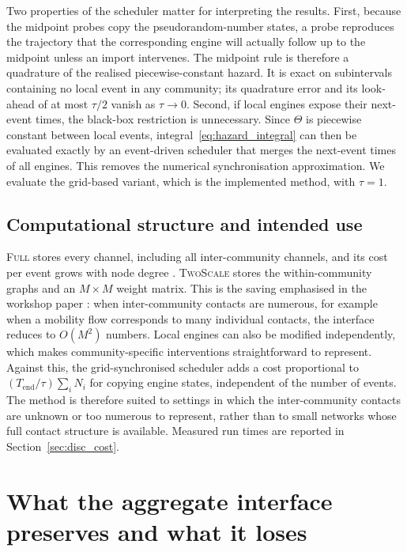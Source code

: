 \documentclass[a4paper,fleqn]{cas-sc}
\newcommand{\Full}{\textup{\textsc{Full}}}
\newcommand{\TS}{\textup{\textsc{TwoScale}}}
\begin{document}
Two properties of the scheduler matter for interpreting the results. First, because the midpoint probes copy the pseudorandom-number states, a probe reproduces the trajectory that the corresponding engine will actually follow up to the midpoint unless an import intervenes. The midpoint rule is therefore a quadrature of the realised piecewise-constant hazard. It is exact on subintervals containing no local event in any community; its quadrature error and its look-ahead of at most $\tau/2$ vanish as $\tau\to0$. Second, if local engines expose their next-event times, the black-box restriction is unnecessary. Since $\Theta$ is piecewise constant between local events, integral~\eqref{eq:hazard_integral} can then be evaluated exactly by an event-driven scheduler that merges the next-event times of all engines. This removes the numerical synchronisation approximation. We evaluate the grid-based variant, which is the implemented method, with $\tau=1$.

\subsection{Computational structure and intended use}
\label{sec:cost}

\Full{} stores every channel, including all inter-community channels, and its cost per event grows with node degree \citep{kuryliak2025simulating}. \TS{} stores the within-community graphs and an $M\times M$ weight matrix. This is the saving emphasised in the workshop paper \citep{kuryliak2025towards}: when inter-community contacts are numerous, for example when a mobility flow corresponds to many individual contacts, the interface reduces to $O(M^2)$ numbers. Local engines can also be modified independently, which makes community-specific interventions straightforward to represent. Against this, the grid-synchronised scheduler adds a cost proportional to $(T_{\mathrm{end}}/\tau)\sum_iN_i$ for copying engine states, independent of the number of events. The method is therefore suited to settings in which the inter-community contacts are unknown or too numerous to represent, rather than to small networks whose full contact structure is available. Measured run times are reported in Section~\ref{sec:disc_cost}.

\section{What the aggregate interface preserves and what it loses}
\label{sec:analysis}
\end{document}
